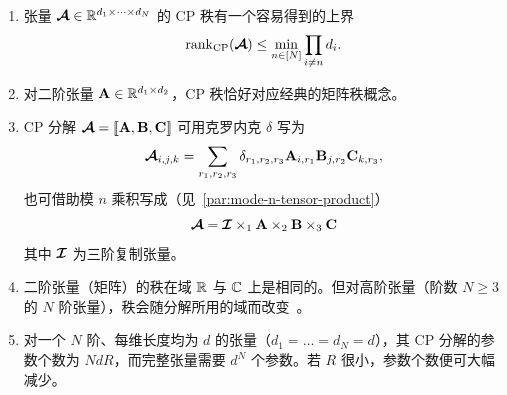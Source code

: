 \begin{remark}
\begin{enumerate}
\begin{align*}
\begin{tikzpicture}[baseline=\baseline]
    \draw[edge](C) -- (\x+2,\y-0.7)node [midway,left] {\scalebox{0.7}{\dimcolor{$d_3$}}};
    \draw[edge](D) -- (\x+3,\y-0.7) node [midway,left] {\scalebox{0.7}{\dimcolor{$d_4$}}};
\end{tikzpicture}\right)_{(\{1,2\})}\\
&=
\begin{tikzpicture}[baseline=\baseline]
    \tikzset{tensor/.style = {minimum size = 0.5cm,shape = circle,thick,draw=black,inner sep = 0pt}, edge/.style   = {thick,line width=.4mm},every loop/.style={}}
    \def\y{0}
    \def\x{0}
  \node[tensor,fill=red!50!white] (A) at (\x,\y){\scalebox{0.85}{$\Ab_1$}};
  \node[tensor,fill=blue!50!white] (B) at (\x+1,\y){$\Ab_2$};
   \node[tensor,fill=red!20!white] (C) at (\x+2,\y){$\Ab_3$};
    \node[tensor,fill=blue!20!white] (D) at (\x+3,\y){$\Ab_4$};
    \draw  node[fill = black,circle,inner sep=0pt,minimum size=4pt] (m1) at (\x+0.5,\y+0.7) {};
    \draw  node[fill = black,circle,inner sep=0pt,minimum size=4pt] (m2) at (\x+2.5,\y+0.7) {};
    \draw[edge](A) -- (\x,\y-0.65) -- (\x+0.5,\y-0.65) -- (\x+0.5,\y-1);
    \draw[edge](B) -- (\x+1,\y-0.65) -- (\x+0.6,\y-0.65) -- (\x+0.6,\y-1);
    \draw[edge](C) -- (\x+2,\y-0.65) -- (\x+2.5,\y-0.65) -- (\x+2.5,\y-1);
    \draw[edge](D) -- (\x+3,\y-0.65) -- (\x+2.6,\y-0.65) -- (\x+2.6,\y-1);
    \node[draw=none] at (\x+0.55,\y-1.15){\scalebox{0.7}{\dimcolor{$d_1d_2$}}};
    \node[draw=none] at (\x+2.55,\y-1.15){\scalebox{0.7}{\dimcolor{$d_3d_4$}}};
    \draw[dotted] (\x+1.5,\y+1.5) -- (\x+1.5,\y-0.7);
    \draw[edge](A) -- (m1)node [midway,left] {\scalebox{0.7}{\dimcolor{$R$}}};;
    \draw[edge](B) -- (m1)node [midway,right] {\scalebox{0.7}{\dimcolor{$R$}}};
    \draw[edge](C) -- (m2)node [midway,left] {\scalebox{0.7}{\dimcolor{$R$}}};
    \draw[edge](D) -- (m2)node [midway,right] {\scalebox{0.7}{\dimcolor{$R$}}};
    \draw[edge](m1)--(m2)node [near start, above] {\scalebox{0.7}{\dimcolor{$R$}}};
\end{tikzpicture}.
\end{align*}
\item  张量 $\bm{\mathcal{A}} \in \mathbb{R}^{d_1\times \cdots \times d_N}$ 的 CP 秩有一个容易得到的上界~\citep{kolda2009tensor}
$$\mathrm{rank}_{\mathrm{CP}}(\bm{\mathcal{A}})\leq \min_{n\in [N]} \prod_{i\neq n} d_i.$$
\item 对二阶张量 $\mathbf{A}\in\mathbb{R}^{d_1\times d_2}$，CP 秩恰好对应经典的矩阵秩概念。
\item CP 分解 $\bm{\mathcal{A}} = \llbracket \mathbf{A},\mathbf{B},\mathbf{C} \rrbracket$ 可用克罗内克 $\delta$ 写为
$$\bm{\mathcal{A}}_{i,j,k} = \sum_{r_1,r_2,r_3}\delta_{r_1,r_2,r_3}\mathbf{A}_{i,r_1}\mathbf{B}_{j,r_2}\mathbf{C}_{k,r_3},$$
也可借助模 $n$ 乘积写成（见~\ref{par:mode-n-tensor-product}）
$$\bm{\mathcal{A}} = \bm{\mathcal{I}}\times_{1}\mathbf{A}\times_{2}\mathbf{B}\times_{3}\mathbf{C}$$
其中 $\bm{\mathcal{I}}$ 为三阶复制张量。
\item 二阶张量（矩阵）的秩在域 $\mathbb{R}$ 与 $\mathbb{C}$ 上是相同的。但对高阶张量（阶数 $N\geq3$ 的 $N$ 阶张量），秩会随分解所用的域而改变~\citep{kruskal1989rank}。
\item 对一个 $N$ 阶、每维长度均为 $d$ 的张量（$d_1 = \dots = d_N = d$），其 CP 分解的参数个数为 $NdR$，而完整张量需要 $d^N$ 个参数。若 $R$ 很小，参数个数便可大幅减少。
\end{enumerate}
\end{remark}
